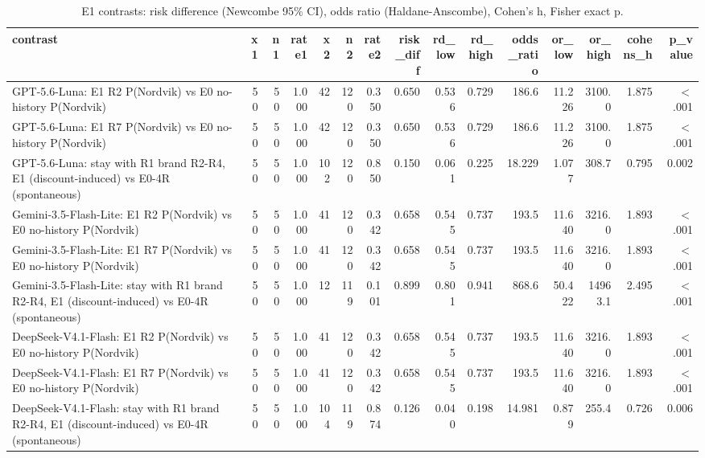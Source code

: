 \begin{table}[htbp]
\centering
\scriptsize
\caption{E1 contrasts: risk difference (Newcombe 95\% CI), odds ratio (Haldane-Anscombe), Cohen's h, Fisher exact p.}
\label{tab:tab09_e1_contrasts}
\begin{tabular}{lrrrrrrrrrrrrrr}
\toprule
contrast & x1 & n1 & rate1 & x2 & n2 & rate2 & risk\_diff & rd\_low & rd\_high & odds\_ratio & or\_low & or\_high & cohens\_h & p\_value \\
\midrule
GPT-5.6-Luna: E1 R2 P(Nordvik) vs E0 no-history P(Nordvik) & 50 & 50 & 1.000 & 42 & 120 & 0.350 & 0.650 & 0.536 & 0.729 & 186.6 & 11.226 & 3100.0 & 1.875 & $<$.001 \\
GPT-5.6-Luna: E1 R7 P(Nordvik) vs E0 no-history P(Nordvik) & 50 & 50 & 1.000 & 42 & 120 & 0.350 & 0.650 & 0.536 & 0.729 & 186.6 & 11.226 & 3100.0 & 1.875 & $<$.001 \\
GPT-5.6-Luna: stay with R1 brand R2-R4, E1 (discount-induced) vs E0-4R (spontaneous) & 50 & 50 & 1.000 & 102 & 120 & 0.850 & 0.150 & 0.061 & 0.225 & 18.229 & 1.077 & 308.7 & 0.795 & 0.002 \\
Gemini-3.5-Flash-Lite: E1 R2 P(Nordvik) vs E0 no-history P(Nordvik) & 50 & 50 & 1.000 & 41 & 120 & 0.342 & 0.658 & 0.545 & 0.737 & 193.5 & 11.640 & 3216.0 & 1.893 & $<$.001 \\
Gemini-3.5-Flash-Lite: E1 R7 P(Nordvik) vs E0 no-history P(Nordvik) & 50 & 50 & 1.000 & 41 & 120 & 0.342 & 0.658 & 0.545 & 0.737 & 193.5 & 11.640 & 3216.0 & 1.893 & $<$.001 \\
Gemini-3.5-Flash-Lite: stay with R1 brand R2-R4, E1 (discount-induced) vs E0-4R (spontaneous) & 50 & 50 & 1.000 & 12 & 119 & 0.101 & 0.899 & 0.801 & 0.941 & 868.6 & 50.422 & 14963.1 & 2.495 & $<$.001 \\
DeepSeek-V4.1-Flash: E1 R2 P(Nordvik) vs E0 no-history P(Nordvik) & 50 & 50 & 1.000 & 41 & 120 & 0.342 & 0.658 & 0.545 & 0.737 & 193.5 & 11.640 & 3216.0 & 1.893 & $<$.001 \\
DeepSeek-V4.1-Flash: E1 R7 P(Nordvik) vs E0 no-history P(Nordvik) & 50 & 50 & 1.000 & 41 & 120 & 0.342 & 0.658 & 0.545 & 0.737 & 193.5 & 11.640 & 3216.0 & 1.893 & $<$.001 \\
DeepSeek-V4.1-Flash: stay with R1 brand R2-R4, E1 (discount-induced) vs E0-4R (spontaneous) & 50 & 50 & 1.000 & 104 & 119 & 0.874 & 0.126 & 0.040 & 0.198 & 14.981 & 0.879 & 255.4 & 0.726 & 0.006 \\
\bottomrule
\end{tabular}
\end{table}